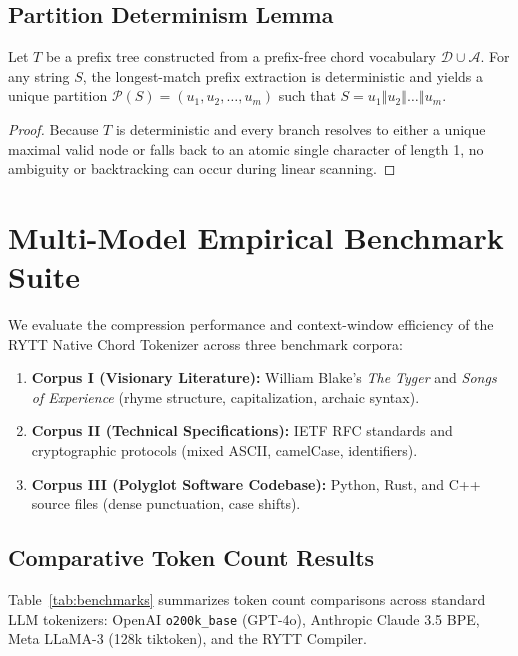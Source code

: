 \documentclass[11pt,oneside,letterpaper]{article}
\theoremstyle{definition}
\begin{document}
\subsection{Partition Determinism Lemma}
\begin{lemma}
Let $T$ be a prefix tree constructed from a prefix-free chord vocabulary $\mathcal{D} \cup \mathcal{A}$. For any string $S$, the longest-match prefix extraction is deterministic and yields a unique partition $\mathcal{P}(S) = (u_1, u_2, \dots, u_m)$ such that $S = u_1 \mathbin{\Vert} u_2 \mathbin{\Vert} \dots \mathbin{\Vert} u_m$.
\end{lemma}
\begin{proof}
Because $T$ is deterministic and every branch resolves to either a unique maximal valid node or falls back to an atomic single character of length 1, no ambiguity or backtracking can occur during linear scanning.
\end{proof}

\section{Multi-Model Empirical Benchmark Suite}

We evaluate the compression performance and context-window efficiency of the RYTT Native Chord Tokenizer across three benchmark corpora:
\begin{enumerate}
  \item \textbf{Corpus I (Visionary Literature):} William Blake's \textit{The Tyger} and \textit{Songs of Experience} (rhyme structure, capitalization, archaic syntax).
  \item \textbf{Corpus II (Technical Specifications):} IETF RFC standards and cryptographic protocols (mixed ASCII, camelCase, identifiers).
  \item \textbf{Corpus III (Polyglot Software Codebase):} Python, Rust, and C++ source files (dense punctuation, case shifts).
\end{enumerate}

\subsection{Comparative Token Count Results}
Table~\ref{tab:benchmarks} summarizes token count comparisons across standard LLM tokenizers: OpenAI \texttt{o200k\_base} (GPT-4o), Anthropic Claude 3.5 BPE, Meta LLaMA-3 (128k tiktoken), and the RYTT Compiler.
\end{document}
